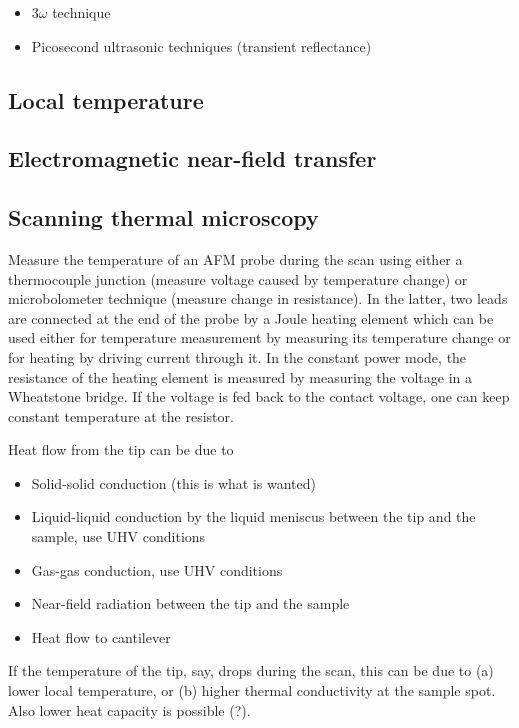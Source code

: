 \begin{itemize}
 \item $3\omega$ technique
 \item Picosecond ultrasonic techniques (transient reflectance)
\end{itemize}

\subsection{Local temperature}

\subsection{Electromagnetic near-field transfer}

\subsection{Scanning thermal microscopy}

Measure the temperature of an AFM probe during the scan using either a thermocouple junction (measure voltage caused by temperature change) or microbolometer technique (measure change in resistance). In the latter, two leads are connected at the end of the probe by a Joule heating element which can be used either for temperature measurement by measuring its temperature change or for heating by driving current through it. In the constant power mode, the resistance of the heating element is measured by measuring the voltage in a Wheatstone bridge. If the voltage is fed back to the contact voltage, one can keep constant temperature at the resistor. 

Heat flow from the tip can be due to
\begin{itemize}
 \item Solid-solid conduction (this is what is wanted)
 \item Liquid-liquid conduction by the liquid meniscus between the tip and the sample, use UHV conditions
 \item Gas-gas conduction, use UHV conditions
 \item Near-field radiation between the tip and the sample
 \item Heat flow to cantilever
\end{itemize}

If the temperature of the tip, say, drops during the scan, this can be due to (a) lower local temperature, or (b) higher thermal conductivity at the sample spot. Also lower heat capacity is possible (?). 

